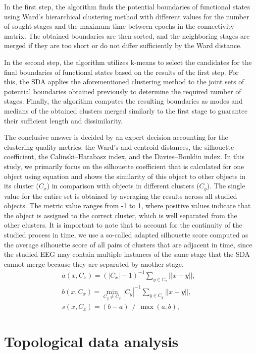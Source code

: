 \documentclass[10pt]{iopart}
\begin{document}
In the first step, the algorithm finds the potential boundaries of functional states using Ward's hierarchical clustering method with different values for the number of sought stages and the maximum time between epochs in the connectivity matrix. The obtained boundaries are then sorted, and the neighboring stages are merged if they are too short or do not differ sufficiently by the Ward distance.

In the second step, the algorithm utilizes k-means to select the candidates for the final boundaries of functional states based on the results of the first step. For this, the SDA applies the aforementioned clustering method to the joint sets of potential boundaries obtained previously to determine the required number of stages. Finally, the algorithm computes the resulting boundaries as modes and medians of the obtained clusters merged similarly to the first stage to guarantee their sufficient length and dissimilarity.

The conclusive answer is decided by an expert decision accounting for the clustering quality metrics: the Ward's and centroid distances, the silhouette coefficient, the Calinski--Harabasz index, and the Davies--Bouldin index. In this study, we primarily focus on the silhouette coefficient that is calculated for one object using equation  and shows the similarity of this object to other objects in its cluster ($C_x$) in comparison with objects in different clusters ($C_y$). The single value for the entire set is obtained by averaging the results across all studied objects. The metric value ranges from -1 to 1, where positive values indicate that the object is assigned to the correct cluster, which is well separated from the other clusters. It is important to note that to account for the continuity of the studied process in time, we use a so-called adapted silhouette score computed as the average silhouette score of all pairs of clusters that are adjacent in time, since the studied EEG may contain multiple instances of the same stage that the SDA cannot merge because they are separated by another stage.
\begin{eqnarray}
    a(x, C_x) = {(|C_x| - 1)} ^ {-1} \sum_{y \in C_x} ||x - y||, \nonumber\\
    b(x, C_x) = \min_{C_y \ne C_x} {|C_y|} ^ {-1} \sum_{y \in C_y} ||x - y||, \nonumber\\
    s(x, C_x) = (b - a)~~/~~\max(a, b), \label{eq1}
\end{eqnarray}

\section{Topological data analysis}
\end{document}
